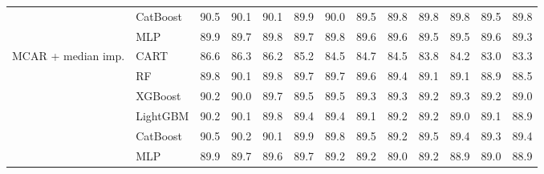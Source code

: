 \begin{table}[p]
\begin{tabular}{@{}llrrrrrrrrrrr@{}}
 & CatBoost & 90.5 & 90.1 & 90.1 & 89.9 & 90.0 & 89.5 & 89.8 & 89.8 & 89.8 & 89.5 & 89.8 \\
 & MLP & 89.9 & 89.7 & 89.8 & 89.7 & 89.8 & 89.6 & 89.6 & 89.5 & 89.5 & 89.6 & 89.3 \\
\midrule
MCAR + median imp. & CART & 86.6 & 86.3 & 86.2 & 85.2 & 84.5 & 84.7 & 84.5 & 83.8 & 84.2 & 83.0 & 83.3 \\
 & RF & 89.8 & 90.1 & 89.8 & 89.7 & 89.7 & 89.6 & 89.4 & 89.1 & 89.1 & 88.9 & 88.5 \\
 & XGBoost & 90.2 & 90.0 & 89.7 & 89.5 & 89.5 & 89.3 & 89.3 & 89.2 & 89.3 & 89.2 & 89.0 \\
 & LightGBM & 90.2 & 90.1 & 89.8 & 89.4 & 89.4 & 89.1 & 89.2 & 89.2 & 89.0 & 89.1 & 88.9 \\
 & CatBoost & 90.5 & 90.2 & 90.1 & 89.9 & 89.8 & 89.5 & 89.2 & 89.5 & 89.4 & 89.3 & 89.4 \\
 & MLP & 89.9 & 89.7 & 89.6 & 89.7 & 89.2 & 89.2 & 89.0 & 89.2 & 88.9 & 89.0 & 88.9 \\
\bottomrule
\end{tabular}
\end{table}

